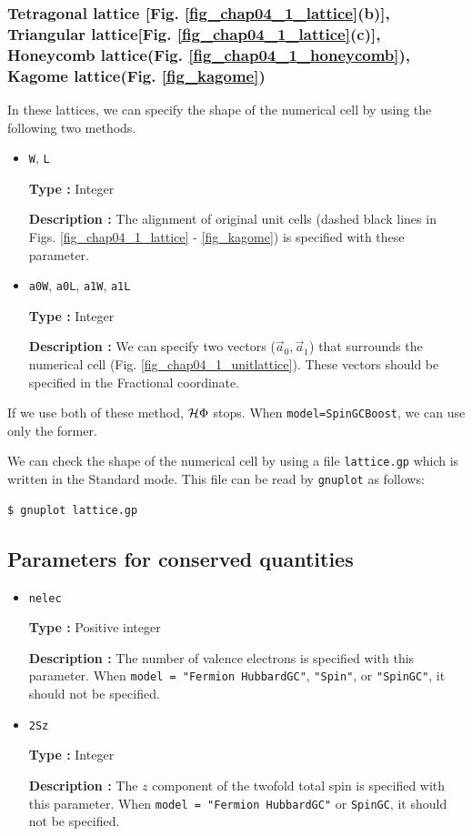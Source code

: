 \subsubsection{Tetragonal lattice [Fig. \ref{fig_chap04_1_lattice}(b)], 
Triangular lattice[Fig. \ref{fig_chap04_1_lattice}(c)],
Honeycomb lattice(Fig. \ref{fig_chap04_1_honeycomb}),
Kagome lattice(Fig. \ref{fig_kagome})}

In these lattices,
we can specify the shape of the numerical cell by using the following two methods.

\begin{itemize}

\item \verb|W|, \verb|L|

{\bf Type :} Integer

{\bf Description :} The alignment of original unit cells 
(dashed black lines in Figs. \ref{fig_chap04_1_lattice} - \ref{fig_kagome})
is specified with these parameter.

\item \verb|a0W|, \verb|a0L|, \verb|a1W|, \verb|a1L|

{\bf Type :} Integer

{\bf Description :} 
We can specify two vectors (${\vec a}_0, {\vec a}_1$)
that surrounds the numerical cell (Fig. \ref{fig_chap04_1_unitlattice}).
These vectors should be specified in the Fractional coordinate.

\end{itemize}

If we use both of these method, $\mathcal{H} \Phi$ stops.
When \verb|model=SpinGCBoost|, we can use only the former.

We can check the shape of the numerical cell
by using a file \verb|lattice.gp|
which is written in the Standard mode.
This file can be read by \verb|gnuplot| as follows:
\begin{verbatim}
$ gnuplot lattice.gp
\end{verbatim}

\subsection{Parameters for conserved quantities}

\begin{itemize}
\item \verb|nelec|

{\bf Type :} Positive integer

{\bf Description :} The number of valence electrons is specified with this parameter.
When \verb|model = "Fermion HubbardGC"|, \verb|"Spin"|, or  \verb|"SpinGC"|, 
it should not be specified.

\item \verb|2Sz|

{\bf Type :} Integer

{\bf Description :} The $z$ component of the twofold total spin is 
specified with this parameter.
When \verb|model = "Fermion HubbardGC"| or \verb|SpinGC|,
it should not be specified. 
\end{itemize}


